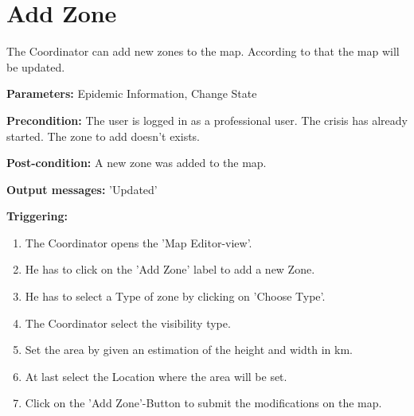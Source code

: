 \section{Add Zone}
\label{operation:AddZone}
The Coordinator can add new zones to the map. According to that the map will
be updated.\\
\begin{description}
\item \textbf{Parameters:} Epidemic Information, Change State
\item \textbf{Precondition:} The user is logged in as a professional user. The
crisis has already started. The zone to add doesn't exists.
\item \textbf{Post-condition:} A new zone was added to the map.
\item \textbf{Output messages:} 'Updated'
\item \textbf{Triggering:}
\begin{enumerate}
\item The Coordinator opens the 'Map Editor-view'.
\item He has to click on the 'Add Zone' label to add a new Zone.
\item He has to select a Type of zone by clicking on 'Choose Type'.
\item The Coordinator select the visibility type.
\item Set the area by given an estimation of the height and width in km.
\item At last select the Location where the area will be set.
\item Click on the 'Add Zone'-Button to submit the modifications
on the map.
\end{enumerate}
\end{description} 

